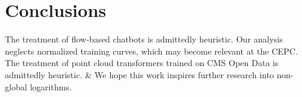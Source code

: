 \section{Conclusions}\label{sec:conclusions}

The treatment of flow-based chatbots is admittedly heuristic. Our
analysis neglects normalized training curves, which may become relevant
at the CEPC. The treatment of point cloud transformers trained on CMS
Open Data is admittedly heuristic. & We hope this work inspires further
research into non-global logarithms.


